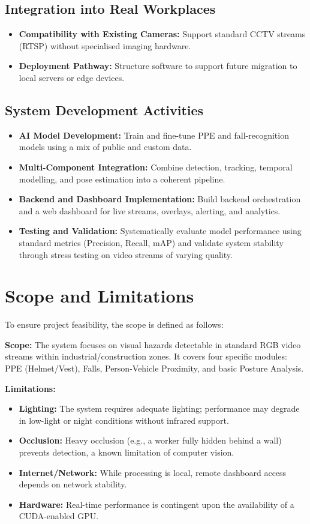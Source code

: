 \subsection{Integration into Real Workplaces}

\begin{itemize}
\item \textbf{Compatibility with Existing Cameras:} Support standard CCTV streams (RTSP) without specialised imaging hardware.
\item \textbf{Deployment Pathway:} Structure software to support future migration to local servers or edge devices.
\end{itemize}

\subsection{System Development Activities}

\begin{itemize}
\item \textbf{AI Model Development:} Train and fine-tune PPE and fall-recognition models using a mix of public and custom data.
\item \textbf{Multi-Component Integration:} Combine detection, tracking, temporal modelling, and pose estimation into a coherent pipeline.
\item \textbf{Backend and Dashboard Implementation:} Build backend orchestration and a web dashboard for live streams, overlays, alerting, and analytics.
\item \textbf{Testing and Validation:} Systematically evaluate model performance using standard metrics (Precision, Recall, mAP) and validate system stability through stress testing on video streams of varying quality.
\end{itemize}

\section{Scope and Limitations}

To ensure project feasibility, the scope is defined as follows:

\textbf{Scope:} The system focuses on visual hazards detectable in standard RGB video streams within industrial/construction zones. It covers four specific modules: PPE (Helmet/Vest), Falls, Person-Vehicle Proximity, and basic Posture Analysis.

\textbf{Limitations:}

\begin{itemize}
\item \textbf{Lighting:} The system requires adequate lighting; performance may degrade in low-light or night conditions without infrared support.
\item \textbf{Occlusion:} Heavy occlusion (e.g., a worker fully hidden behind a wall) prevents detection, a known limitation of computer vision.
\item \textbf{Internet/Network:} While processing is local, remote dashboard access depends on network stability.
\item \textbf{Hardware:} Real-time performance is contingent upon the availability of a CUDA-enabled GPU.
\end{itemize}

